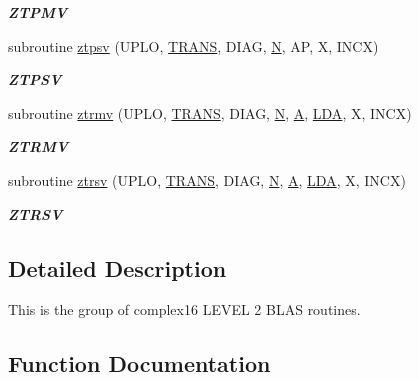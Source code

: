 \begin{DoxyCompactItemize}
\begin{DoxyCompactList}\small\item\em {\bfseries Z\+T\+P\+M\+V} \end{DoxyCompactList}\item 
subroutine \hyperlink{group__complex16__blas__level2_ga8e2b6e006861da3d455817cf928d9972}{ztpsv} (U\+P\+L\+O, \hyperlink{superlu__enum__consts_8h_a0c4e17b2d5cea33f9991ccc6a6678d62a1f61e3015bfe0f0c2c3fda4c5a0cdf58}{T\+R\+A\+N\+S}, D\+I\+A\+G, \hyperlink{polmisc_8c_a0240ac851181b84ac374872dc5434ee4}{N}, A\+P, X, I\+N\+C\+X)
\begin{DoxyCompactList}\small\item\em {\bfseries Z\+T\+P\+S\+V} \end{DoxyCompactList}\item 
subroutine \hyperlink{group__complex16__blas__level2_ga5a60882e2e5a7d604f2f16c1e0d8f4b4}{ztrmv} (U\+P\+L\+O, \hyperlink{superlu__enum__consts_8h_a0c4e17b2d5cea33f9991ccc6a6678d62a1f61e3015bfe0f0c2c3fda4c5a0cdf58}{T\+R\+A\+N\+S}, D\+I\+A\+G, \hyperlink{polmisc_8c_a0240ac851181b84ac374872dc5434ee4}{N}, \hyperlink{classA}{A}, \hyperlink{example__user_8c_ae946da542ce0db94dced19b2ecefd1aa}{L\+D\+A}, X, I\+N\+C\+X)
\begin{DoxyCompactList}\small\item\em {\bfseries Z\+T\+R\+M\+V} \end{DoxyCompactList}\item 
subroutine \hyperlink{group__complex16__blas__level2_ga99cc66f0833474d6607e6ea7dbe2f9bd}{ztrsv} (U\+P\+L\+O, \hyperlink{superlu__enum__consts_8h_a0c4e17b2d5cea33f9991ccc6a6678d62a1f61e3015bfe0f0c2c3fda4c5a0cdf58}{T\+R\+A\+N\+S}, D\+I\+A\+G, \hyperlink{polmisc_8c_a0240ac851181b84ac374872dc5434ee4}{N}, \hyperlink{classA}{A}, \hyperlink{example__user_8c_ae946da542ce0db94dced19b2ecefd1aa}{L\+D\+A}, X, I\+N\+C\+X)
\begin{DoxyCompactList}\small\item\em {\bfseries Z\+T\+R\+S\+V} \end{DoxyCompactList}\end{DoxyCompactItemize}


\subsection{Detailed Description}
This is the group of complex16 L\+E\+V\+E\+L 2 B\+L\+A\+S routines. 

\subsection{Function Documentation}
\hypertarget{group__complex16__blas__level2_gab289624f8fdc44e20c5ab79f9cc1f631}{}
